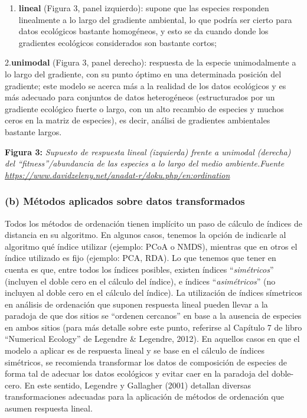 \documentclass[
]{book}
\providecommand{\tightlist}{%
  \setlength{\itemsep}{0pt}\setlength{\parskip}{0pt}}
\begin{document}
\begin{enumerate}
\def\labelenumi{\arabic{enumi}.}
\tightlist
\item
  \textbf{lineal} (Figura 3, panel izquierdo): supone que las especies responden linealmente a lo largo del gradiente ambiental, lo que podría ser cierto para datos ecológicos bastante homogéneos, y esto se da cuando donde los gradientes ecológicos considerados son bastante cortos;
\end{enumerate}

2.\textbf{unimodal} (Figura 3, panel derecho): respuesta de la especie unimodalmente a lo largo del gradiente, con su punto óptimo en una determinada posición del gradiente; este modelo se acerca más a la realidad de los datos ecológicos y es más adecuado para conjuntos de datos heterogéneos (estructurados por un gradiente ecológico fuerte o largo, con un alto recambio de especies y muchos ceros en la matriz de especies), es decir, análisi de gradientes ambientales bastante largos.

\textbf{Figura 3:} \emph{Supuesto de respuesta lineal (izquierda) frente a unimodal (derecha) del ``fitness''/abundancia de las especies a lo largo del medio ambiente.Fuente \url{https://www.davidzeleny.net/anadat-r/doku.php/en:ordination}}

\hypertarget{b-muxe9todos-aplicados-sobre-datos-transformados}{%
\subsubsection{(b) Métodos aplicados sobre datos transformados}\label{b-muxe9todos-aplicados-sobre-datos-transformados}}

Todos los métodos de ordenación tienen implícito un paso de cálculo de índices de distancia en su algoritmo. En algunos casos, tenemos la opción de indicarle al algoritmo qué índice utilizar (ejemplo: PCoA o NMDS), mientras que en otros el índice utilizado es fijo (ejemplo: PCA, RDA). Lo que tenemos que tener en cuenta es que, entre todos los índices posibles, existen índices ``\emph{simétricos}'' (incluyen el doble cero en el cálculo del índice), e índices ``\emph{asimétricos}'' (no incluyen al doble cero en el cálculo del índice). La utilización de índices símetricos en análisis de ordenación que suponen respuesta lineal pueden llevar a la paradoja de que dos sitios se ``ordenen cercanos'' en base a la ausencia de especies en ambos sitios (para más detalle sobre este punto, referirse al Capítulo 7 de libro ``Numerical Ecology'' de Legendre \& Legendre, 2012). En aquellos casos en que el modelo a aplicar es de respuesta lineal y se base en el cálculo de índices simétricos, se recomienda transformar los datos de composición de especies de forma tal de adecuar los datos ecológicos y evitar caer en la paradoja del doble-cero. En este sentido, Legendre y Gallagher (2001) detallan diversas transformaciones adecuadas para la aplicación de métodos de ordenación que asumen respuesta lineal.
\end{document}
